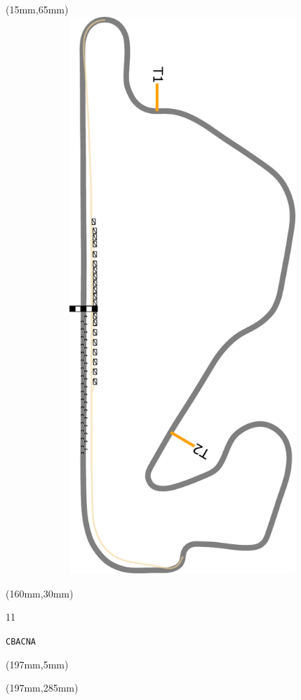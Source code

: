 \begin{textblock*}{185mm}(15mm,65mm)%
\centering
\mbox{\includegraphics[width=185mm,height=210mm,keepaspectratio]{PT/CBACNA.pdf}}
\end{textblock*}
\begin{textblock*}{40mm}(160mm,30mm)%
\Large
\par{} 
\par11 
\par\hfill\tiny\tt CBACNA\\
\end{textblock*}
\begin{textblock*}{20mm}(197mm,5mm)%
\fbox{\thepage}
\label{CBACNA}
\end{textblock*}
\begin{textblock*}{20mm}(197mm,285mm)%
\fbox{\thepage}
\end{textblock*}

